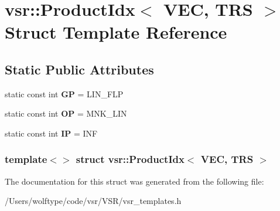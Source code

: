 \hypertarget{structvsr_1_1_product_idx_3_01_v_e_c_00_01_t_r_s_01_4}{\section{vsr\-:\-:Product\-Idx$<$ V\-E\-C, T\-R\-S $>$ Struct Template Reference}
\label{structvsr_1_1_product_idx_3_01_v_e_c_00_01_t_r_s_01_4}
}
\subsection*{Static Public Attributes}
\begin{DoxyCompactItemize}
\item 
\hypertarget{structvsr_1_1_product_idx_3_01_v_e_c_00_01_t_r_s_01_4_a4f192fc84dd072b495c8ebaf132b24bc}{static const int {\bfseries G\-P} = L\-I\-N\-\_\-\-F\-L\-P}\label{structvsr_1_1_product_idx_3_01_v_e_c_00_01_t_r_s_01_4_a4f192fc84dd072b495c8ebaf132b24bc}

\item 
\hypertarget{structvsr_1_1_product_idx_3_01_v_e_c_00_01_t_r_s_01_4_a812cd090f3e28edd1b00b130f5720516}{static const int {\bfseries O\-P} = M\-N\-K\-\_\-\-L\-I\-N}\label{structvsr_1_1_product_idx_3_01_v_e_c_00_01_t_r_s_01_4_a812cd090f3e28edd1b00b130f5720516}

\item 
\hypertarget{structvsr_1_1_product_idx_3_01_v_e_c_00_01_t_r_s_01_4_a9df42f82b9af06c94248fbdad0b32952}{static const int {\bfseries I\-P} = I\-N\-F}\label{structvsr_1_1_product_idx_3_01_v_e_c_00_01_t_r_s_01_4_a9df42f82b9af06c94248fbdad0b32952}

\end{DoxyCompactItemize}
\subsubsection*{template$<$$>$ struct vsr\-::\-Product\-Idx$<$ V\-E\-C, T\-R\-S $>$}



The documentation for this struct was generated from the following file\-:\begin{DoxyCompactItemize}
\item 
/\-Users/wolftype/code/vsr/\-V\-S\-R/vsr\-\_\-templates.\-h\end{DoxyCompactItemize}
